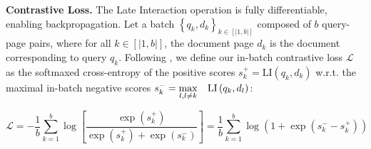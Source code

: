 
\noindent\textbf{Contrastive Loss.}
The Late Interaction operation is fully differentiable, enabling backpropagation.
Let a batch $\left\{ q_k, d_k \right\}_{k \in [|1, b |]}$ composed of $b$ query-page pairs, where for all $k \in [|1, b|]$, the document page $d_k$ is the document corresponding to query $q_k$. 
Following , we define our in-batch contrastive loss $\mathcal{L}$ as the softmaxed cross-entropy of the positive scores $s_k^+ = \text{LI} \left( q_k, d_k \right)$ w.r.t. the maximal in-batch negative scores $s_k^- = \max \limits_{l, l \neq k} \hspace{3mm} \text{LI} \left( q_k, d_l \right) $:





\begin{equation}
    \mathcal{L} = -\frac{1}{b} \sum_{k=1}^{b} \log \left[ \frac{\exp \left( s_k^+ \right)}{\exp \left( s_k^+ \right) + \exp \left( s_k^- \right)} \right] = \frac{1}{b} \sum_{k=1}^{b} \log \left( 1 + \exp \left( s_k^- - s_k^+ \right) \right)
    \label{equation:colpali_loss_full}
\end{equation}




